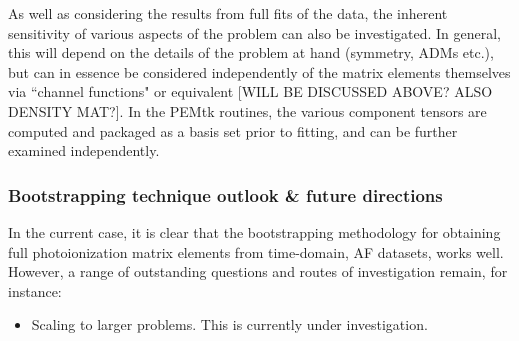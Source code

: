 As well as considering the results from full fits of the data, the inherent sensitivity of various aspects of the problem can also be investigated. In general, this will depend on the details of the problem at hand (symmetry, ADMs etc.), but can in essence be considered independently of the matrix elements themselves via ``channel functions" or equivalent [WILL BE DISCUSSED ABOVE? ALSO DENSITY MAT?]. In the PEMtk routines, the various component tensors are computed and packaged as a basis set prior to fitting, and can be further examined independently.


\subsubsection{Bootstrapping technique outlook \& future directions}

In the current case, it is clear that the bootstrapping methodology for obtaining full photoionization matrix elements from time-domain, AF datasets, works well. However, a range of outstanding questions and routes of investigation remain, for instance:

\begin{itemize}
\item Scaling to larger problems. This is currently under investigation.
\end{itemize}
